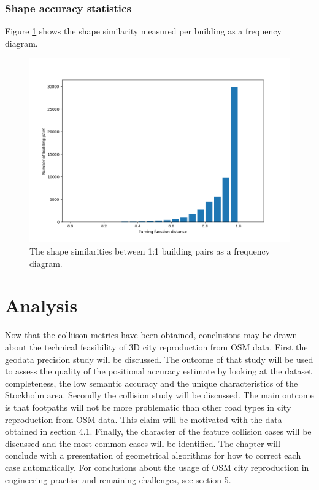 \documentclass{kththesis}
\begin{document}
\subsubsection{Shape accuracy statistics}

Figure \ref{fig:bar-plot-similarity} shows the shape similarity measured per building as a frequency diagram.

\begin{figure}[H]
    \centering
    \includegraphics[width=\textwidth,height=0.5\textheight,keepaspectratio]{img_turning_function_plot}
    \caption{The shape similarities between 1:1 building pairs as a frequency diagram.}
    \label{fig:bar-plot-similarity}
\end{figure}

\section{Analysis}

Now that the colliison metrics have been obtained, conclusions may be drawn about the technical feasibility of 3D city reproduction from OSM data.
First the geodata precision study will be discussed.
The outcome of that study will be used to assess the quality of the positional accuracy estimate by looking at the dataset completeness, the low semantic accuracy and the unique characteristics of the Stockholm area.
Secondly the collision study will be discussed.
The main outcome is that footpaths will not be more problematic than other road types in city reproduction from OSM data.
This claim will be motivated with the data obtained in section 4.1.
Finally, the character of the feature collision cases will be discussed and the most common cases will be identified.
The chapter will conclude with a presentation of geometrical algorithms for how to correct each case automatically.
For conclusions about the usage of OSM city reproduction in engineering practise and remaining challenges, see section 5.
\end{document}
